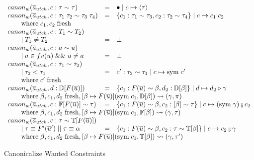 \begin{figure}
\small
{}
\[
\begin{array}{l c l}
canon_w(\overline{a}_{utch}, c : \tau \sim \tau) &=& \bullet \mid c \mapsto \langle \tau \rangle
\\
canon_w(\overline{a}_{utch}, c : \tau_1 \; \tau_2 \sim \tau_3 \; \tau_4) &=& \{c_1 : \tau_1 \sim
\tau_3, c_2 : \tau_2  \sim \tau_4\} \mid c \mapsto c_1 \; c_2
\\ \where c_1, c_2 \; \text{fresh}
\\
canon_w(\overline{a}_{utch}, c : T_1 \sim T_2)
\\ \guard T_1 \neq T_2 &=& \bot
\\
canon_w(\overline{a}_{utch}, c : a \sim u)
\\ \guard a \in fv(u) \; \&\& \; u \neq a &=& \bot
\\
canon_w(\overline{a}_{utch}, c : \tau_1 \sim \tau_2)
\\ \qquad \mid \tau_2 < \tau_1 &=& c' : \tau_2 \sim \tau_1 \mid c \mapsto \text{sym}
\; c'
\\ \where c' \; \text{fresh}
\\
canon_w(\overline{a}_{utch}, d : \mathbb{D}[F(\overline{u})]) &=& \{ c_1 :
F(\overline{u}) \sim \beta, d_2 : \mathbb{D}[\beta]\} \mid d \mapsto d_2
\triangleright \gamma
\\ \multicolumn{3}{l}{\where \beta, c_1, d_2 \; \text{fresh}, [\beta \mapsto
F(\overline{u})](\text{sym} \; c_1, \mathbb{D}[\beta]) \rightsquigarrow (\gamma,
\pi)}
\\
canon_w(\overline{a}_{utch}, c : \mathbb{F}[F(\overline{u})] \sim \tau) &=&
\{c_1 : F(\overline{u}) \sim \beta, c_2 : \mathbb[\beta] \sim \tau \} \mid c
\mapsto (\text{sym} \; \gamma) \fctrans c_2
\\ \multicolumn{3}{l}{\where \beta, c_1, d_2 \; \text{fresh},
[\beta \mapsto F(\overline{u})](\text{sym} \;
c_1, \mathbb{F}[\beta]) \rightsquigarrow (\gamma, \tau)}
\\
canon_w(\overline{a}_{utch}, c : \tau \sim \mathbb{T}[F(\overline{u})])
\\ \qquad \mid \tau \equiv F'(\overline{u}') \; || \; \tau \equiv \alpha &=&
\{c_1 : F(\overline{u}) \sim \beta, c_2 : \tau \sim \mathbb{T}[\beta]\} \mid c
\mapsto c_2 \fctrans \gamma
\\ \multicolumn{3}{l}{\where \beta, c_1, d_2 \; \text{fresh},
[\beta \mapsto F(\overline{u})](\text{sym} \;
c_1, \mathbb{T}[\beta]) \rightsquigarrow (\gamma, \tau')}
\end{array}
\]
\caption{Canonicalize Wanted Constraints}
\label{fig:canon_w}
\end{figure}

